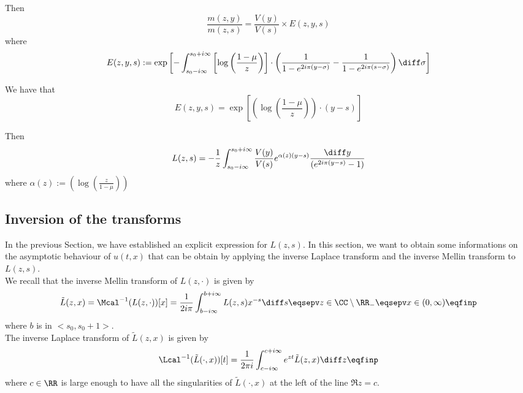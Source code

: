 Then 
\begin{equation*}
    \frac{m(z,y)}{m(z,s)} 
    = 
    \frac{V(y)}{V(s)} \times E(z,y,s)
\end{equation*}
where $$E(z,y,s) := \exp \left[
    - \int_{s_0-i\infty}^{s_0+i\infty} \left[\log \left( \frac{1-\mu}{z}\right) \right]
    \cdot \left(
        \frac{1}{1-e^{2i\pi(y-\sigma)}} - \frac{1}{1-e^{2i\pi(s-\sigma)}}
     \right) \diff \sigma \right]
     $$

We have that
\begin{equation*}
    E(z,y,s) 
    = 
    \exp
        \left[
     \left(\log \left( \frac{1-\mu}{z}\right) \right)
    \cdot (y-s)\right]
\end{equation*}

Then 
\begin{equation}\label{eq:exprL}
    L(z,s) 
    = 
   - \frac{1}{z}\int_{s_0-i\infty}^{s_0+i\infty} \frac{V(y)}{V(s)} e^{ \alpha(z)(y-s)}
   \frac{\diff y}{(e^{2i\pi(y-s)}-1)}
\end{equation}
where $\alpha(z) :=  
    \left(\log \left( \frac{z}{1-\mu}\right)\right)$
\subsection{Inversion of the transforms} In the previous Section, we have established an explicit expression for $L(z,s)$. In this section, we want to obtain some informations on the asymptotic behaviour of $u(t,x)$ that can be obtain by applying the inverse Laplace transform and the inverse Mellin transform to $L(z,s)$. \\

We recall that the inverse Mellin transform of $L(z,\cdot)$ is given by 
\begin{equation*}
    \tilde{L}(z,x) = \Mcal^{-1}(L(z, \cdot))[x] = \frac{1}{2i\pi} \int_{b-i\infty}^{b+i\infty} L(z,s)x^{-s}\diff s
    \eqsepv
    z \in \CC \setminus \RR_-
    \eqsepv x \in (0, \infty)
    \eqfinp
\end{equation*}
where $b$ is in $<s_0, s_0+1>$.\\
The inverse Laplace transform of $\tilde{L}(z,x)$ is given by 
\begin{equation*}
     \Lcal^{-1}(\tilde L(\cdot, x))[t] 
     = \frac{1}{2\pi i} \int_{c-i\infty}^{c+i\infty} e^{zt}\tilde L(z,x) \diff z
     \eqfinp
\end{equation*}
where $c \in \RR$ is large enough to have all the singularities of $\tilde L(\cdot,x)$ at the left of the line $\Re z = c$. 
\medskip

